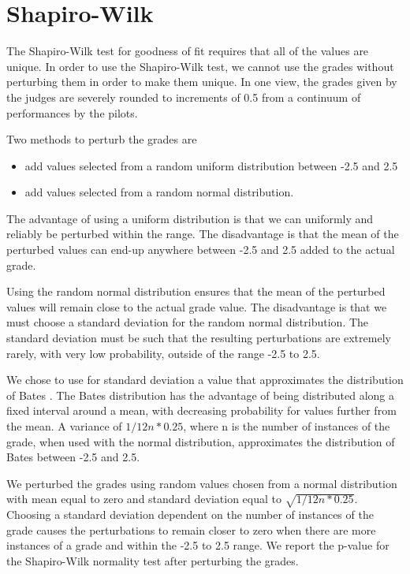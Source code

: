 \section{Shapiro-Wilk}

The Shapiro-Wilk test for goodness of fit requires that all of the values
are unique. In order to use the Shapiro-Wilk test, we
cannot use the grades without perturbing them in order to make them unique.
In one view, the grades given by the judges are severely rounded to increments
of 0.5 from a continuum of performances by the pilots.

Two methods to perturb the grades are
\begin{itemize}
\item add values selected from a random uniform distribution between -2.5 and
2.5
\item add values selected from a random normal distribution.
\end{itemize}

The advantage of using a uniform distribution is that we can uniformly and
reliably be perturbed within the range. The disadvantage is that the mean
of the perturbed values can end-up anywhere between -2.5 and 2.5 added to
the actual grade.

Using the random normal distribution ensures that the mean of the perturbed
values will remain close to the actual grade value. The disadvantage is that
we must choose a standard deviation for the random normal distribution.
The standard deviation must be such that the resulting perturbations are
extremely rarely, with very low probability, outside of the range -2.5 to
2.5.

We chose to use for standard deviation a value that approximates the
distribution of Bates . The Bates distribution has the
advantage of being distributed along a fixed interval around a mean, with
decreasing probability for values further from the mean.
A variance of $1/12n * 0.25$, where n is the number of instances of the
grade, when used
with the normal distribution, approximates the distribution of Bates between
-2.5 and 2.5.

We perturbed the grades using random values chosen from a normal distribution
with mean equal to zero and standard deviation equal to $\sqrt{1/12n * 0.25}$.
Choosing a standard deviation dependent on the number of instances
of the grade causes the perturbations to remain closer to zero when there
are more instances of a grade and within the -2.5 to 2.5 range.
We report the p-value for the Shapiro-Wilk normality test after perturbing
the grades.
